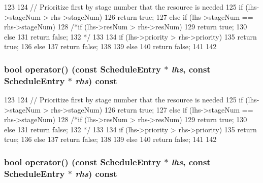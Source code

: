 \begin{DoxyCode}
123         {
124             // Prioritize first by stage number that the resource is needed
125             if (lhs->stageNum > rhs->stageNum) {
126                 return true;
127             } else if (lhs->stageNum == rhs->stageNum) {
128                 /*if (lhs->resNum > rhs->resNum) {
129                   return true;
130                 } else {
131                   return false;
132                   }*/
133 
134                 if (lhs->priority > rhs->priority) {
135                   return true;
136                 } else {
137                   return false;
138                 }
139             } else {
140                 return false;
141             }
142         }
\end{DoxyCode}
\hypertarget{structThePipeline_1_1entryCompare_a7e59a50d3469340b40f804ec6d38594f}{
\subsubsection[{operator()}]{\setlength{\rightskip}{0pt plus 5cm}bool operator() (const {\bf ScheduleEntry} $\ast$ {\em lhs}, \/  const {\bf ScheduleEntry} $\ast$ {\em rhs}) const}}
\label{structThePipeline_1_1entryCompare_a7e59a50d3469340b40f804ec6d38594f}



\begin{DoxyCode}
123         {
124             // Prioritize first by stage number that the resource is needed
125             if (lhs->stageNum > rhs->stageNum) {
126                 return true;
127             } else if (lhs->stageNum == rhs->stageNum) {
128                 /*if (lhs->resNum > rhs->resNum) {
129                   return true;
130                 } else {
131                   return false;
132                   }*/
133 
134                 if (lhs->priority > rhs->priority) {
135                   return true;
136                 } else {
137                   return false;
138                 }
139             } else {
140                 return false;
141             }
142         }
\end{DoxyCode}
\hypertarget{structThePipeline_1_1entryCompare_a7e59a50d3469340b40f804ec6d38594f}{
\subsubsection[{operator()}]{\setlength{\rightskip}{0pt plus 5cm}bool operator() (const {\bf ScheduleEntry} $\ast$ {\em lhs}, \/  const {\bf ScheduleEntry} $\ast$ {\em rhs}) const}}
\label{structThePipeline_1_1entryCompare_a7e59a50d3469340b40f804ec6d38594f}



